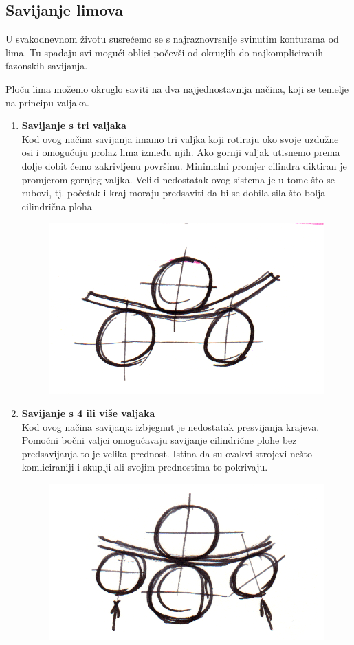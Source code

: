 \documentclass[a4paper,12pt]{article}
\numberwithin{figure}{section}
\begin{document}
\subsection{Savijanje limova}
U svakodnevnom životu susrećemo se s najraznovrsnije svinutim konturama od lima. Tu spadaju svi mogući oblici počevši od okruglih do najkompliciranih fazonskih savijanja. \par
Ploču lima možemo okruglo saviti na dva najjednostavnija načina, koji se temelje na principu valjaka.
\begin{enumerate}
\item \textbf{Savijanje s tri valjaka} \\
Kod ovog načina savijanja imamo tri valjka koji rotiraju oko svoje uzdužne osi i omogućuju prolaz lima između njih. Ako gornji valjak utisnemo prema dolje dobit ćemo zakrivljenu površinu. Minimalni promjer cilindra diktiran je promjerom gornjeg valjka. Veliki nedostatak ovog sistema je u tome što se rubovi, tj. početak i kraj moraju predsaviti da bi se dobila sila što bolja cilindrična ploha
\begin{figure}[!h]
\centering
\includegraphics[scale=0.15]{image_48-1.png}
\end{figure}
\FloatBarrier
\item \textbf{Savijanje s 4 ili više valjaka} \\
Kod ovog načina savijanja izbjegnut je nedostatak presvijanja krajeva. Pomoćni bočni valjci omogućavaju savijanje cilindrične plohe bez predsavijanja to je velika prednost. Istina da su ovakvi strojevi nešto komliciraniji i skuplji ali svojim prednostima to pokrivaju.
\begin{figure}[!h]
\centering
\includegraphics[scale=0.15]{image_48-2.png}

\end{figure}
\end{enumerate}
\end{document}
